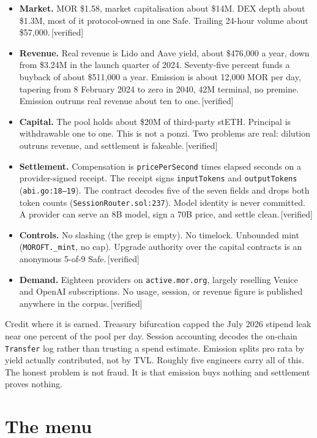 \documentclass[11pt,a4paper]{article}
\newcommand{\code}[1]{\texttt{\small #1}}
\newcommand{\lab}[1]{{\color{muted}\footnotesize\,[#1]}}
\begin{document}
\begin{itemize}
\item \textbf{Market.} MOR \$1.58, market capitalisation about \$14M. DEX depth
about \$1.3M, most of it protocol-owned in one Safe. Trailing 24-hour
volume about \$57{,}000.\lab{verified}
\item \textbf{Revenue.} Real revenue is Lido and Aave yield, about \$476{,}000 a
year, down from \$3.24M in the launch quarter of 2024. Seventy-five percent funds
a buyback of about \$511{,}000 a year. Emission is about 12{,}000 MOR per day, tapering
from 8 February 2024 to zero in 2040, 42M terminal, no premine. Emission outruns
real revenue about ten to one.\lab{verified}
\item \textbf{Capital.} The pool holds about \$20M of third-party stETH.
Principal is withdrawable one to one. This is not a ponzi. Two problems are real:
dilution outruns revenue, and settlement is fakeable.\lab{verified}
\item \textbf{Settlement.} Compensation is \code{pricePerSecond} times elapsed
seconds on a provider-signed receipt. The receipt signs \code{inputTokens} and
\code{outputTokens} (\code{abi.go:18--19}). The contract decodes five of the
seven fields and drops both token counts (\code{SessionRouter.sol:237}). Model
identity is never committed. A provider can serve an 8B model, sign a 70B price,
and settle clean.\lab{verified}
\item \textbf{Controls.} No slashing (the grep is empty). No timelock. Unbounded
mint (\code{MOROFT.\_mint}, no cap). Upgrade authority over the capital contracts
is an anonymous 5-of-9 Safe.\lab{verified}
\item \textbf{Demand.} Eighteen providers on \code{active.mor.org}, largely
reselling Venice and OpenAI subscriptions. No usage, session, or revenue figure
is published anywhere in the corpus.\lab{verified}
\end{itemize}

Credit where it is earned. Treasury bifurcation capped the July 2026 stipend leak
near one percent of the pool per day. Session accounting decodes the on-chain
\code{Transfer} log rather than trusting a spend estimate. Emission splits pro
rata by yield actually contributed, not by TVL. Roughly five engineers carry all
of this. The honest problem is not fraud. It is that emission buys nothing and
settlement proves nothing.

\section*{The menu}
\end{document}

